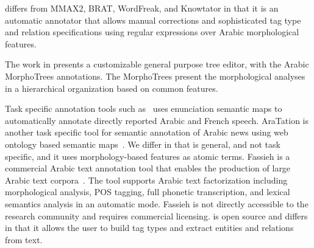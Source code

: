 \framework differs from MMAX2, BRAT, WordFreak, and Knowtator in that it is 
an automatic annotator that allows manual corrections 
and sophisticated tag type and relation specifications using regular expressions over
Arabic morphological features.

The work in \cite{smrz2004morphotrees} presents %
a customizable general purpose tree editor, with the Arabic MorphoTrees annotations. 
The MorphoTrees present the morphological analyses in a hierarchical organization 
based on common features. 

Task specific annotation tools such as~\cite{alrahabi2006semantic}
uses enunciation semantic maps to automatically annotate 
directly reported Arabic and French speech. 
AraTation is another task specific tool for semantic annotation of 
Arabic news using web ontology based semantic maps~\cite{saleh2009aratation}.
We differ in that \framework is general, and not task specific, and it uses 
morphology-based features as atomic terms.
Fassieh is a commercial Arabic text annotation tool that enables the production of large 
Arabic text corpora~\cite{attia2009fassieh}. 
The tool supports Arabic text factorization including morphological analysis, POS tagging, 
full phonetic transcription, and lexical semantics analysis in an automatic mode. 
Fassieh is not directly accessible to the research community and requires commercial licensing. 
\framework is open source and differs in that it allows the user to build tag types 
and extract entities and relations from text.

